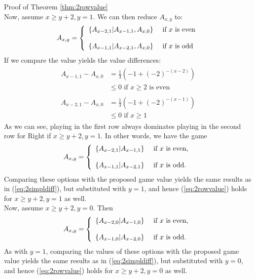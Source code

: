 \begin{proof2}{Proof of Theorem \ref{thm:2rowvalue}}
\\
Now, assume $x\ge y+2,y=1$. We can then reduce $A_{x,y}$ to:
\begin{align*}
A_{x,y}=\left\{
\begin{array}{l l}
\left\{A_{x-2,1}\middle|A_{x-1,1},A_{x,0}\right\}&\text{ if $x$ is even}\\
~\\
\left\{A_{x-1,1}\middle|A_{x-2,1},A_{x,0}\right\}&\text{ if $x$ is odd}
\end{array}\right.
\end{align*}
If we compare the value yields the value differences:
\begin{align*}
\begin{split}
A_{x-1,1}-A_{x,0}&=\frac{1}{3}\left(-1+(-2)^{-(x-2)}\right)\\
&\le0\text{ if $x\ge2$ is even}
\end{split}\\
\begin{split}
A_{x-2,1}-A_{x,0}&=\frac{1}{3}\left(-1+(-2)^{-(x-1)}\right)\\
&\le0\text{ if $x\ge 1$}
\end{split}
\end{align*}
As we can see, playing in the first row always dominates playing in the second row for Right if $x\ge y+2,y=1$. In other words, we have the game
\begin{align*}
A_{x,y}=\left\{
\begin{array}{l l}
\left\{A_{x-2,1}\middle|A_{x-1,1}\right\}&\text{ if $x$ is even,}\\
~\\
\left\{A_{x-1,1}\middle|A_{x-2,1}\right\}&\text{ if $x$ is odd.}
\end{array}\right.
\end{align*}
Comparing these options with the proposed game value yields the same results as in (\ref{eq:2simpldiff}), but substituted with $y=1$, and hence (\ref{eq:2rowvalue}) holds for $x\ge y+2,y=1$ as well.
\\
Now, assume $x\ge y+2,y=0$. Then
\begin{align*}
A_{x,y}=\left\{
\begin{array}{l l}
\left\{A_{x-2,0}\middle|A_{x-1,0}\right\}&\text{ if $x$ is even,}\\
~\\
\left\{A_{x-1,0}\middle|A_{x-2,0}\right\}&\text{ if $x$ is odd.}
\end{array}\right.
\end{align*}
As with $y=1$, comparing the values of these options with the proposed game value yields the same results as in (\ref{eq:2simpldiff}), but substituted with $y=0$, and hence (\ref{eq:2rowvalue}) holds for $x\ge y+2,y=0$ as well. 

\end{proof2}

